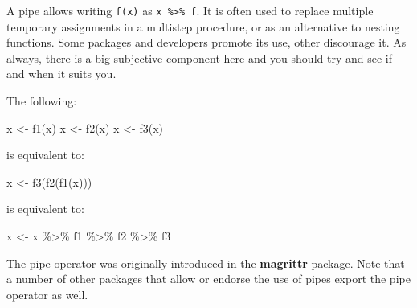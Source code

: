 \documentclass[
]{book}
\newenvironment{Shaded}{\begin{snugshade}}{\end{snugshade}}
\newcommand{\ControlFlowTok}[1]{\textcolor[rgb]{0.13,0.29,0.53}{\textbf{#1}}}
\newcommand{\DecValTok}[1]{\textcolor[rgb]{0.00,0.00,0.81}{#1}}
\newcommand{\FunctionTok}[1]{\textcolor[rgb]{0.00,0.00,0.00}{#1}}
\newcommand{\NormalTok}[1]{#1}
\newcommand{\OtherTok}[1]{\textcolor[rgb]{0.56,0.35,0.01}{#1}}
\newcommand{\SpecialCharTok}[1]{\textcolor[rgb]{0.00,0.00,0.00}{#1}}
\begin{document}
A pipe allows writing \texttt{f(x)} as \texttt{x\ \%\textgreater{}\%\ f}. It is often used to replace multiple temporary assignments in a multistep procedure, or as an alternative to nesting functions. Some packages and developers promote its use, other discourage it. As always, there is a big subjective component here and you should try and see if and when it suits you.

The following:

\begin{Shaded}
\begin{Highlighting}[]
\NormalTok{x }\OtherTok{\textless{}{-}} \FunctionTok{f1}\NormalTok{(x)}
\NormalTok{x }\OtherTok{\textless{}{-}} \FunctionTok{f2}\NormalTok{(x)}
\NormalTok{x }\OtherTok{\textless{}{-}} \FunctionTok{f3}\NormalTok{(x)}
\end{Highlighting}
\end{Shaded}

is equivalent to:

\begin{Shaded}
\begin{Highlighting}[]
\NormalTok{x }\OtherTok{\textless{}{-}} \FunctionTok{f3}\NormalTok{(}\FunctionTok{f2}\NormalTok{(}\FunctionTok{f1}\NormalTok{(x)))}
\end{Highlighting}
\end{Shaded}

is equivalent to:

\begin{Shaded}
\begin{Highlighting}[]
\NormalTok{x }\OtherTok{\textless{}{-}}\NormalTok{ x }\SpecialCharTok{\%\textgreater{}\%}\NormalTok{ f1 }\SpecialCharTok{\%\textgreater{}\%}\NormalTok{ f2 }\SpecialCharTok{\%\textgreater{}\%}\NormalTok{ f3}
\end{Highlighting}
\end{Shaded}

The pipe operator was originally introduced in the \textbf{magrittr} package. Note that a number of other packages that allow or endorse the use of pipes export the pipe operator as well.

\begin{Shaded}
\end{Shaded}
\end{document}
